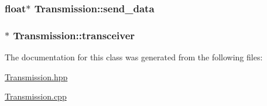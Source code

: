 \subsubsection[{\texorpdfstring{send\+\_\+data}{send_data}}]{\setlength{\rightskip}{0pt plus 5cm}float$\ast$ Transmission\+::send\+\_\+data\hspace{0.3cm}{\ttfamily [protected]}}\hypertarget{classTransmission_add4a43e6cb4a7598ac9e37f02971371b}{}\label{classTransmission_add4a43e6cb4a7598ac9e37f02971371b}
\subsubsection[{\texorpdfstring{transceiver}{transceiver}}]{$\ast$ Transmission\+::transceiver\hspace{0.3cm}{\ttfamily [protected]}}\hypertarget{classTransmission_a4136f9d979a928565232a2d3d6eb5ac5}{}\label{classTransmission_a4136f9d979a928565232a2d3d6eb5ac5}


The documentation for this class was generated from the following files\+:\begin{DoxyCompactItemize}
\item 
\hyperlink{Transmission_8hpp}{Transmission.\+hpp}\item 
\hyperlink{Transmission_8cpp}{Transmission.\+cpp}\end{DoxyCompactItemize}
